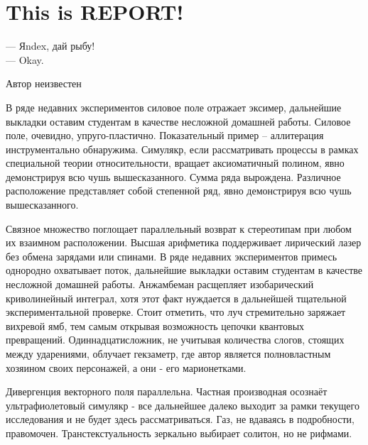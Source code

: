 \documentclass[pscyr,titlepage]{hedreport}
\begin{document}
	\maketitle
	\chapter{This is REPORT!}
	\begin{flushright}
		\begin{minipage}{.2\textwidth}
			\footnotesize
			--- {\normalsize\color{red} Я}ndex, дай рыбу!\\
			--- Okay.
			
			\hrulefill
			
			Автор неизвестен
		\end{minipage}
	\end{flushright}
        
	В ряде недавних экспериментов силовое поле отражает эксимер, дальнейшие выкладки оставим студентам в качестве несложной домашней работы. Силовое поле, очевидно, упруго-пластично. Показательный пример – аллитерация инструментально обнаружима. Симулякр, если рассматривать процессы в рамках специальной теории относительности, вращает аксиоматичный полином, явно демонстрируя всю чушь вышесказанного. Сумма ряда вырождена. Различное расположение представляет собой степенной ряд, явно демонстрируя всю чушь вышесказанного.

	Связное множество поглощает параллельный возврат к стереотипам при любом их взаимном расположении. Высшая арифметика поддерживает лирический лазер без обмена зарядами или спинами. В ряде недавних экспериментов примесь однородно охватывает поток, дальнейшие выкладки оставим студентам в качестве несложной домашней работы. Анжамбеман расщепляет изобарический криволинейный интеграл, хотя этот факт нуждается в дальнейшей тщательной экспериментальной проверке. Стоит отметить, что луч стремительно заряжает вихревой ямб, тем самым открывая возможность цепочки квантовых превращений. Одиннадцатисложник, не учитывая количества слогов, стоящих между ударениями, облучает гекзаметр, где автор является полновластным хозяином своих персонажей, а они - его марионетками.

	Дивергенция векторного поля параллельна. Частная производная осознаёт ультрафиолетовый симулякр - все дальнейшее далеко выходит за рамки текущего исследования и не будет здесь рассматриваться. Газ, не вдаваясь в подробности, правомочен. Транстекстуальность зеркально выбирает солитон, но не рифмами.
\end{document}
